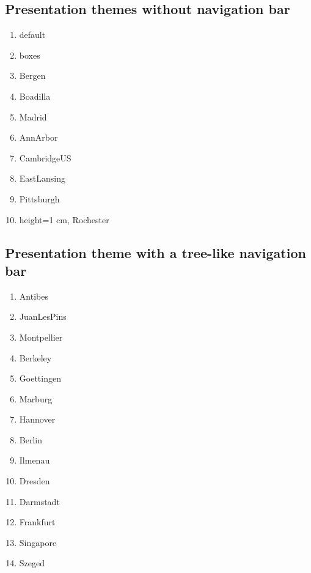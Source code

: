 \documentclass[11 pt]{book}
\begin{document}
\subsection{Presentation themes without navigation bar}
\begin{enumerate}
 \item default
 \item boxes
 \item Bergen
 \item Boadilla
 \item Madrid
 \item AnnArbor
 \item CambridgeUS
 \item EastLansing
 \item Pittsburgh
 \item height=1 cm, Rochester
\end{enumerate}

\subsection{Presentation theme with a tree-like navigation bar}
\begin{enumerate}
 \item Antibes
 \item JuanLesPins
 \item Montpellier
 \item Berkeley
 \item Goettingen
 \item Marburg
 \item Hannover
 \item Berlin
 \item Ilmenau
 \item Dresden
 \item Darmstadt
 \item Frankfurt
 \item Singapore
 \item Szeged
\end{enumerate}
\end{document}
